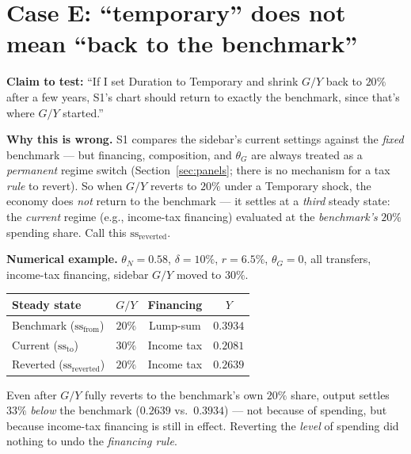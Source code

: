 \documentclass[11pt]{article}
\begin{document}
\section{Case E: ``temporary'' does not mean ``back to the benchmark''}
\label{sec:caseE}

\textbf{Claim to test:} ``If I set Duration to Temporary and shrink $G/Y$
back to $20\%$ after a few years, S1's chart should return to
exactly the benchmark, since that's where $G/Y$ started.''

\textbf{Why this is wrong.} S1 compares the sidebar's current
settings against the \emph{fixed} benchmark --- but financing, composition, and $\theta_G$ are always
treated as a \emph{permanent} regime switch (Section~\ref{sec:panels};
there is no mechanism for a tax \emph{rule} to revert). So when $G/Y$
reverts to $20\%$ under a Temporary shock, the economy does \emph{not}
return to the benchmark --- it settles at a \emph{third} steady state:
the \emph{current} regime (e.g., income-tax financing) evaluated at the
\emph{benchmark's} $20\%$ spending share. Call this $\text{ss}_{\text{reverted}}$.

\begin{casebox}
\textbf{Numerical example.} $\theta_N=0.58$, $\delta=10\%$, $r=6.5\%$,
$\theta_G=0$, all transfers, income-tax financing, sidebar $G/Y$ moved to
$30\%$.
\begin{center}
\begin{tabular}{lccc}
\toprule
Steady state & $G/Y$ & Financing & $Y$ \\
\midrule
Benchmark ($\text{ss}_{\text{from}}$) & $20\%$ & Lump-sum & $0.3934$ \\
Current ($\text{ss}_{\text{to}}$) & $30\%$ & Income tax & $0.2081$ \\
Reverted ($\text{ss}_{\text{reverted}}$) & $20\%$ & Income tax & $0.2639$ \\
\bottomrule
\end{tabular}
\end{center}
Even after $G/Y$ fully reverts to the benchmark's own $20\%$ share,
output settles $33\%$ \emph{below} the benchmark ($0.2639$ vs.\ $0.3934$)
--- not because of spending, but because income-tax financing is still in
effect. Reverting the \emph{level} of spending did nothing to undo the
\emph{financing rule}.
\end{casebox}
\end{document}
